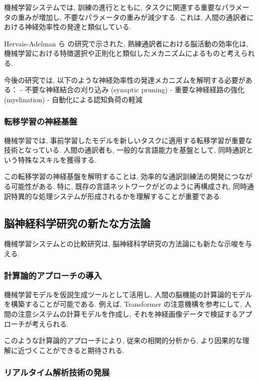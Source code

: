 機械学習システムでは, 訓練の進行とともに, タスクに関連する重要なパラメータの重みが増加し, 不要なパラメータの重みが減少する.
これは, 人間の通訳者における神経効率性の発達と類似している.

Hervais-Adelman ら \cite{hervais2015plasticity} の研究で示された, 熟練通訳者における脳活動の効率化は, 機械学習における特徴選択や正則化と類似したメカニズムによるものと考えられる.

今後の研究では, 以下のような神経効率性の発達メカニズムを解明する必要がある：
- 不要な神経結合の刈り込み (synaptic pruning)
- 重要な神経経路の強化 (myelination)
- 自動化による認知負荷の軽減

\subsubsection{転移学習の神経基盤}

機械学習では, 事前学習したモデルを新しいタスクに適用する転移学習が重要な技術となっている.
人間の通訳者も, 一般的な言語能力を基盤として, 同時通訳という特殊なスキルを獲得する.

この転移学習の神経基盤を解明することは, 効率的な通訳訓練法の開発につながる可能性がある.
特に, 既存の言語ネットワークがどのように再構成され, 同時通訳特異的な処理システムが形成されるかを理解することが重要である.

\subsection{脳神経科学研究の新たな方法論}

機械学習システムとの比較研究は, 脳神経科学研究の方法論にも新たな示唆を与える.

\subsubsection{計算論的アプローチの導入}

機械学習モデルを仮説生成ツールとして活用し, 人間の脳機能の計算論的モデルを構築することが可能である.
例えば, Transformer の注意機構を参考にして, 人間の注意システムの計算モデルを作成し, それを神経画像データで検証するアプローチが考えられる.

このような計算論的アプローチにより, 従来の相関的分析から, より因果的な理解に近づくことができると期待される.

\subsubsection{リアルタイム解析技術の発展}

